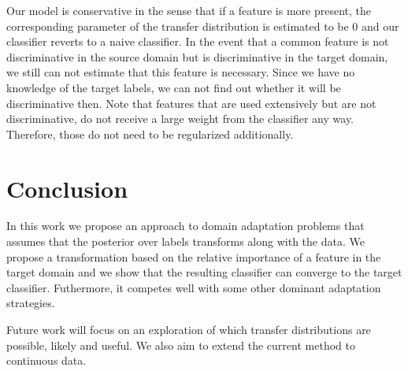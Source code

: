 \documentclass[twoside,11pt]{article}
\begin{document}
Our model is conservative in the sense that if a feature is more present, the corresponding parameter of the transfer distribution is estimated to be $0$ and our classifier reverts to a naive classifier. In the event that a common feature is not discriminative in the source domain but is discriminative in the target domain, we still can not estimate that this feature is necessary. Since we have no knowledge of the target labels, we can not find out whether it will be discriminative then. Note that features that are used extensively but are not discriminative, do not receive a large weight from the classifier any way. Therefore, those do not need to be regularized additionally. 

\section{Conclusion}
In this work we propose an approach to domain adaptation problems that assumes that the posterior over labels transforms along with the data. We propose a transformation based on the relative importance of a feature in the target domain and we show that the resulting classifier can converge to the target classifier. Futhermore, it competes well with some other dominant adaptation strategies.

Future work will focus on an exploration of which transfer distributions are possible, likely and useful. We also aim to extend the current method to continuous data.





\vskip 0.2in

\end{document}

